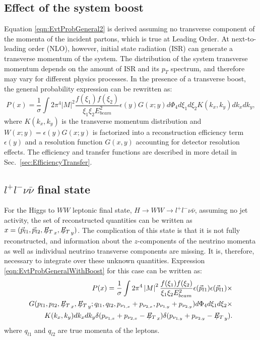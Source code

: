 \documentclass{cmspaper}
\newcommand{\met}{\mbox{$E_T\hspace{-1.1em}/$\hspace{0.7em}}}
\begin{document}
\subsection{Effect of the system boost}
Equation \ref{eqn:EvtProbGeneral2} is derived assuming no transverse component of the momenta of the incident partons,
which is true at Leading Order.   At next-to-leading order (NLO), however, initial state radiation (ISR) can generate a transverse momentum
of the system.  The distribution of the system transverse momentum depends on the amount of ISR and its $p_{T}$ spectrum, and
therefore may vary for different physics processes. In the presence of a transverse boost, the general probability expression can
be rewritten as:
\begin{equation}
P(x)=\frac{1}{\sigma }\int 2 \pi^{4} \left| M \right|^{2} \frac{f(\xi_{1})f(\xi_{2})}{\xi_{1}\xi_{2}E_{beam}^{2}}\epsilon(y)G(x;y)d\Phi_{4}d\xi_{1}d\xi_{2}K(k_{x},k_{y})dk_{x}dk_{y},
\label{eqn:EvtProbGeneralWithBoost}  
\end{equation}
where $K(k_{x},k_{y})$ is the transverse momentum distribution and $W(x;y)=\epsilon(y)G(x;y)$ is factorized into a reconstruction 
efficiency term $\epsilon(y)$ and a resolution function $G(x,y)$ accounting for detector resolution effects.
The efficiency and transfer functions are described in more detail in Sec.~\ref{sec:EfficiencyTransfer}.

\subsection{$l^{+}l^{-}\nu\bar{\nu}$ final state }
For the Higgs to $WW$ leptonic final state, $H \rightarrow WW \rightarrow l^{+}l^{-}\nu\bar{\nu}$, assuming no jet activity, 
the set of reconstructed quantities can be written as $x=(\vec{p}_{l1},\vec{p}_{l2}, \met_{x},  \met_{y})$.
The complication of this state is that it is not fully reconstructed, and information about the $z$-components of the neutrino 
momenta as well as individual neutrino transverse components are missing. It is, therefore, necessary to integrate over these 
unknown quantities. Expression \ref{eqn:EvtProbGeneralWithBoost} for this case can be written as:
\begin{eqnarray}
P(x)=\frac{1}{\sigma }\int 2 \pi^{4} \left| M \right|^{2} \frac{f(\xi_{1})f(\xi_{2})}{\xi_{1}\xi_{2}E_{beam}^{2}}
\epsilon(\vec{p}_{l1})\epsilon(\vec{p}_{l1}) \times \nonumber \\ 
                         G(p_{l1},p_{l2}, \met_{x},  \met_{y}; q_{l1}, q_{l2}, p_{\nu_{1,x}}+  p_{\nu_{2,x}}, p_{\nu_{1,y}}+p_{\nu_{2,y}})d\Phi_{4}d\xi_{1}d\xi_{2} \times \nonumber \\
                         K(k_{x},k_{y})dk_{x}dk_{y}\delta(p_{\nu_{1,x}}+p_{\nu_{2,x}}-\met_{x})\delta(p_{\nu_{1,y}}+p_{\nu_{2,y}}-\met_{y}).
\label{eqn:EvtProbGeneralWithBoost2L2nu}  
\end{eqnarray}
where $q_{l1}$ and $q_{l2}$ are true momenta of the leptons.
\end{document}
